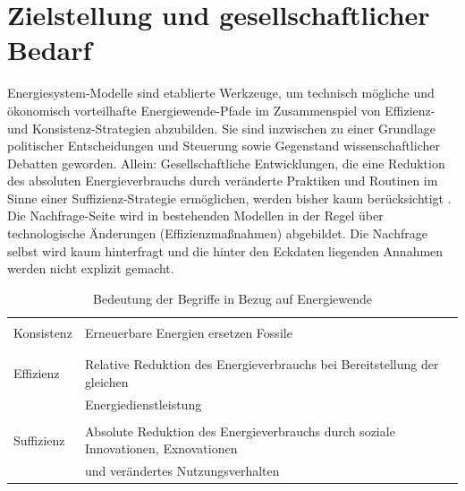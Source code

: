 \documentclass[a4paper,11pt,twoside]{scrartcl}
\begin{document}
\onehalfspacing

\clearpage


{%

}

\setcounter{page}{1}

\section{Zielstellung und gesellschaftlicher Bedarf}
\label{sec:ziel}
Energiesystem-Modelle sind etablierte Werkzeuge, um technisch mögliche und ökonomisch vorteilhafte Energiewende-Pfade im Zusammenspiel von Effizienz- und Konsistenz-Strategien abzubilden. Sie sind inzwischen zu einer Grundlage politischer Entscheidungen und Steuerung sowie Gegenstand wissenschaftlicher Debatten geworden. Allein: Gesellschaftliche Entwicklungen, die eine Reduktion des absoluten Energieverbrauchs durch veränderte Praktiken und Routinen im Sinne einer Suffizienz-Strategie ermöglichen, werden bisher kaum berücksichtigt \cite{SAMADI2017}. Die Nachfrage-Seite wird in bestehenden Modellen in der Regel über technologische Änderungen (Effizienzmaßnahmen) abgebildet. Die Nachfrage selbst wird kaum hinterfragt \cite{Creutzig2018} und die hinter den Eckdaten liegenden Annahmen werden nicht explizit gemacht.

\begin{table}[h]
\begin{center}
\small
  \caption{Bedeutung der Begriffe in Bezug auf Energiewende}
\begin{tabular}[h]{|l | l |}
\hline
&\\
Konsistenz & Erneuerbare Energien ersetzen Fossile\\
&\\
\hline
&\\
 Effizienz & Relative Reduktion des Energieverbrauchs bei Bereitstellung der gleichen\\
 & Energiedienstleistung\\
 \hline
 &\\
Suffizienz & Absolute Reduktion des Energieverbrauchs durch soziale Innovationen, Exnovationen\\
& und verändertes Nutzungsverhalten \\
 \hline
 \end{tabular}
 \label{tab:koefsu}
\end{center}
\end{table}
\end{document}
